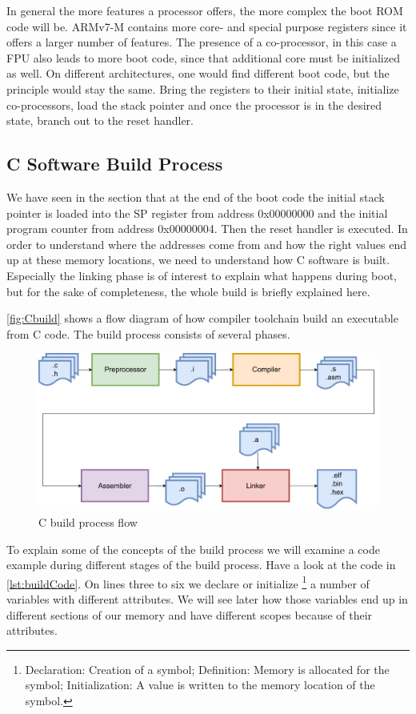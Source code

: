 \documentclass[a4paper,12pt]{article}
\begin{document}
In general the more features a processor offers, the more complex the boot \ac{ROM} code will be. ARMv7-M contains more core- and special purpose registers since it offers a larger number of features. The presence of a co-processor, in this case a \ac{FPU} also leads to more boot code, since that additional core must be initialized as well. On different architectures, one would find different boot code, but the principle would stay the same. Bring the registers to their initial state, initialize co-processors, load the stack pointer and once the processor is in the desired state, branch out to the reset handler.

\subsection{C Software Build Process}\label{sec:buildProcess}
We have seen in the  section that at the end of the boot code the initial stack pointer is loaded into the SP register from address 0x00000000 and the initial program counter from address 0x00000004. Then the reset handler is executed. In order to understand where the addresses come from and how the right values end up at these memory locations, we need to understand how C software is built. Especially the linking phase is of interest to explain what happens during boot, but for the sake of completeness, the whole build is briefly explained here.\par
\autoref{fig:Cbuild} shows a flow diagram of how compiler toolchain build an executable from C code. The build process consists of several phases.

\begin{figure}[H]
  \includegraphics[scale=0.55]{graphics/CBuildProcess.pdf}
  \centering{}
  \caption{C build process flow}
\label{fig:Cbuild}
\end{figure}

To explain some of the concepts of the build process we will examine a code example during different stages of the build process. Have a look at the code in \autoref{lst:buildCode}. On lines three to six we declare or initialize \footnote{Declaration: Creation of a symbol; Definition: Memory is allocated for the symbol; Initialization: A value is written to the memory location of the symbol.} a number of variables with different attributes. We will see later how those variables end up in different sections of our memory and have different scopes because of their attributes.
\end{document}
